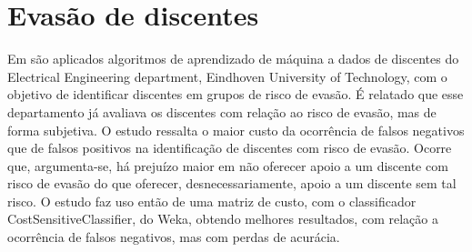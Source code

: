 \chapter{Evasão de discentes}



Em \cite{Predicting_Students} são aplicados algoritmos de aprendizado de máquina a dados de discentes do Electrical Engineering department, Eindhoven University of Technology, com o objetivo de identificar discentes em grupos de risco de evasão. É relatado que esse departamento já avaliava os discentes com relação ao risco de evasão, mas de forma subjetiva. O estudo ressalta o maior custo da ocorrência de falsos negativos que de falsos positivos na identificação de discentes com risco de evasão. Ocorre que, argumenta-se, há prejuízo maior em não oferecer apoio a um discente com risco de evasão do que oferecer, desnecessariamente, apoio a um discente sem tal risco. O estudo faz uso então de uma matriz de custo, com o classificador CostSensitiveClassifier, do Weka, obtendo melhores resultados, com relação a ocorrência de falsos negativos, mas com perdas de acurácia. 





